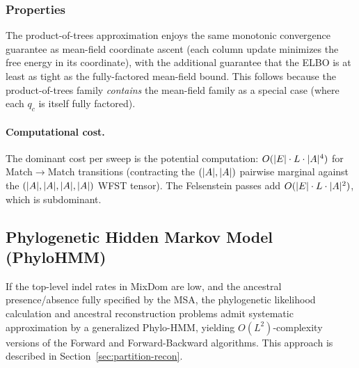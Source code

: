 \subsubsection{Properties}

The product-of-trees approximation enjoys the same monotonic convergence
guarantee as mean-field coordinate ascent (each column update minimizes
the free energy in its coordinate), with the additional guarantee that
the ELBO is at least as tight as the fully-factored mean-field bound.
This follows because the product-of-trees family \emph{contains} the
mean-field family as a special case (where each $q_c$ is itself fully factored).

\paragraph{Computational cost.}
The dominant cost per sweep is the potential computation:
$O(|E| \cdot L \cdot |A|^4)$ for Match$\to$Match transitions
(contracting the $(|A|, |A|)$ pairwise marginal against the
$(|A|, |A|, |A|, |A|)$ WFST tensor).
The Felsenstein passes add $O(|E| \cdot L \cdot |A|^2)$, which is subdominant.


\subsection{Phylogenetic Hidden Markov Model (PhyloHMM)}

If the top-level indel rates in MixDom are low, and the ancestral presence/absence
fully specified by the MSA, the phylogenetic likelihood calculation and ancestral reconstruction
problems admit systematic approximation by a generalized Phylo-HMM,
yielding $O(L^2)$-complexity versions of the Forward and Forward-Backward algorithms.
This approach is described in Section~\ref{sec:partition-recon}.



